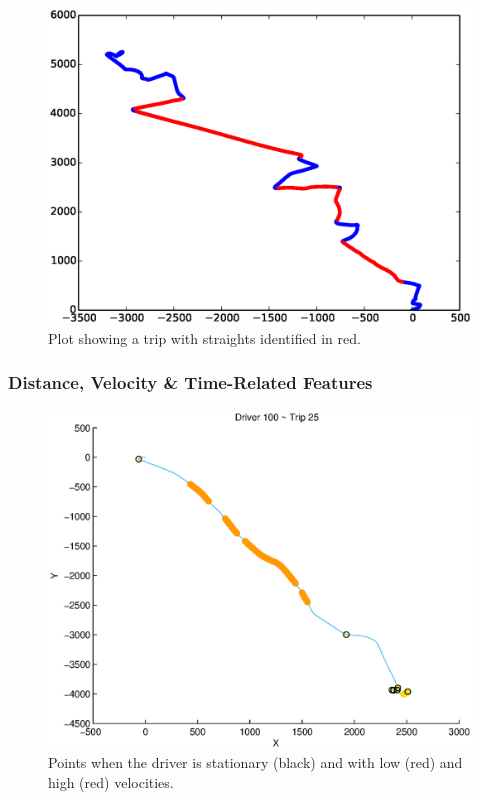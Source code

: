 \documentclass[a4paper, 11pt, twocolumn]{report}
\begin{document}
\begin{figure}[h]
    \center
    \includegraphics[width=\linewidth]{img/straights.eps}
    \caption{Plot showing a trip with straights identified in red.}
    \label{fig:straights}
\end{figure}

\subsubsection{Distance, Velocity \& Time-Related Features}

\begin{figure}[h]
    \center
    \includegraphics[width=\linewidth]{img/speed_highlights.eps}
    \caption{Points when the driver is stationary (black) and with low (red) and high (red) velocities.}
    \label{fig:speedpoints}
\end{figure}
\end{document}

